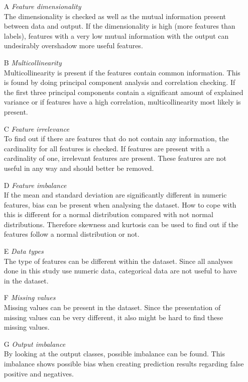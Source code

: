\documentclass[10pt,a4paper]{report}
\begin{document}
	\begin{enumerate}
		\item[A] \textit{Feature dimensionality} \\
		The dimensionality is checked as well as the mutual information present between data and output. If the dimensionality is high (more features than labels), features with a very low mutual information with the output can undesirably overshadow more useful features.
		
		\item[B] \textit{Multicollinearity} \\
		Multicollinearity is present if the features contain common information. This is found by doing principal component analysis and correlation checking. If the first three principal components contain a significant amount of explained variance or if features have a high correlation, multicollinearity most likely is present.
		
		\item[C] \textit{Feature irrelevance} \\
		To find out if there are features that do not contain any information, the cardinality for all features is checked. If features are present with a cardinality of one, irrelevant features are present. These features are not useful in any way and should better be removed.
		
		\item[D] \textit{Feature imbalance} \\
		If the mean and standard deviation are significantly different in numeric features, bias can be present when analysing the dataset. How to cope with this is different for a normal distribution compared with not normal distributions. Therefore skewness and kurtosis can be used to find out if the features follow a normal distribution or not. 
		
		\item[E] \textit{Data types} \\
		The type of features can be different within the dataset. Since all analyses done in this study use numeric data, categorical data are not useful to have in the dataset.
		
		\item[F] \textit{Missing values} \\
		Missing values can be present in the dataset. Since the presentation of missing values can be very different, it also might be hard to find these missing values. %
		
		\item[G] \textit{Output imbalance} \\
		By looking at the output classes, possible imbalance can be found. This imbalance shows possible bias when creating prediction results regarding false positive and negatives.
		
	\end{enumerate}
\end{document}
